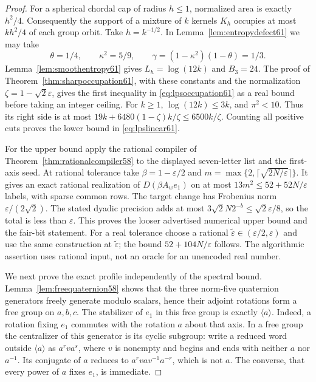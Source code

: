 \begin{proof}
For a spherical chordal cap of radius $h\le1$, normalized area is
exactly $h^2/4$. Consequently the support of a mixture of $k$ kernels
$K_h$ occupies at most $kh^2/4$ of each group orbit. Take $h=k^{-1/2}$.
In Lemma~\ref{lem:entropydefect61} we may take
\[
 \theta=1/4,\qquad \kappa^2=5/9,\qquad
 \gamma=(1-\kappa^2)(1-\theta)=1/3.
\]
Lemma~\ref{lem:smoothentropy61} gives $L_h=\log(12k)$ and $B_3=24$.
The proof of Theorem~\ref{thm:sharpoccupation61}, with these constants
and the normalization $\zeta=1-\sqrt2\varepsilon$, gives the first
inequality in \eqref{eq:lpsoccupation61} as a real bound before taking
an integer ceiling. For $k\ge1$, $\log(12k)\le3k$, and $\pi^2<10$.
Thus its right side is at most
$19k+6480(1-\zeta)k/\zeta\le6500k/\zeta$.
Counting all positive cuts proves the lower bound in
\eqref{eq:lpslinear61}.

For the upper bound apply the rational compiler of
Theorem~\ref{thm:rationalcompiler58} to the displayed seven-letter list
and the first-axis seed. At rational tolerance take
$\beta=1-\varepsilon/2$ and
$m=\max\{2,\lceil\sqrt{2N/\varepsilon}\rceil\}$.
It gives an exact rational realization of $D(\beta A_we_1)$ on at most
$13m^2\le52+52N/\varepsilon$ labels, with sparse common rows.
The target change has Frobenius norm $\varepsilon/(2\sqrt2)$.
The stated dyadic precision adds at most
$3\sqrt2N2^{-b}\le\sqrt2\varepsilon/8$, so the total is less than
$\varepsilon$. This proves the looser advertised numerical upper bound
and the fair-bit statement. For a real tolerance choose a rational
$\widetilde\varepsilon\in(\varepsilon/2,\varepsilon)$ and use the
same construction at $\widetilde\varepsilon$; the bound
$52+104N/\varepsilon$ follows. The algorithmic assertion uses rational
input, not an oracle for an unencoded real number.

We next prove the exact profile independently of the spectral bound.
Lemma~\ref{lem:freequaternion58} shows that the three norm-five
quaternion generators freely generate modulo scalars, hence their
adjoint rotations form a free group on $a,b,c$. The stabilizer of
$e_1$ in this free group is exactly $\langle a\rangle$. Indeed, a
rotation fixing $e_1$ commutes with the rotation $a$ about that axis.
In a free group the centralizer of this generator is its cyclic
subgroup: write a reduced word outside $\langle a\rangle$ as
$a^rva^s$, where $v$ is nonempty and begins and ends with neither
$a$ nor $a^{-1}$. Its conjugate of $a$ reduces to
$a^r v a v^{-1}a^{-r}$, which is not $a$. The converse, that every
power of $a$ fixes $e_1$, is immediate.


\end{proof}

